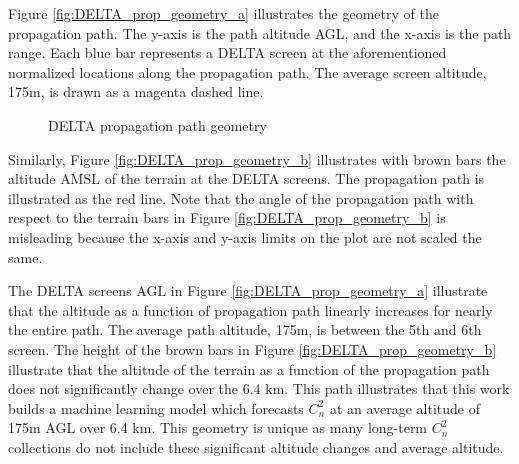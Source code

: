 Figure \ref{fig:DELTA_prop_geometry_a} illustrates the geometry of the propagation path. The y-axis is the path altitude \ac{AGL}, and the x-axis is the path range. Each blue bar represents a DELTA screen at the aforementioned normalized locations along the propagation path. The average screen altitude, 175m, is drawn as a magenta dashed line.
\begin{figure}[h!]
	\centering
	\hfill
	\caption{DELTA propagation path geometry}
	\label{fig:DELTA_prop_geometry}
\end{figure}
Similarly, Figure \ref{fig:DELTA_prop_geometry_b} illustrates with brown bars the altitude \ac{AMSL} of the terrain at the \ac{DELTA} screens. The propagation path is illustrated as the red line. Note that the angle of the propagation path with respect to the terrain bars in Figure \ref{fig:DELTA_prop_geometry_b} is misleading because the x-axis and y-axis limits on the plot are not scaled the same.

The \ac{DELTA} screens \ac{AGL} in Figure \ref{fig:DELTA_prop_geometry_a} illustrate that the altitude as a function of propagation path linearly increases for nearly the entire path. The average path altitude, 175m, is between the 5th and 6th screen. The height of the brown bars in Figure \ref{fig:DELTA_prop_geometry_b} illustrate that the altitude of the terrain as a function of the propagation path does not significantly change over the 6.4 km. This path illustrates that this work builds a machine learning model which forecasts $C_{n}^{2}$ at an average altitude of 175m AGL over 6.4 km. This geometry is unique as many long-term $C_{n}^{2}$ collections do not include these significant altitude changes and average altitude.

